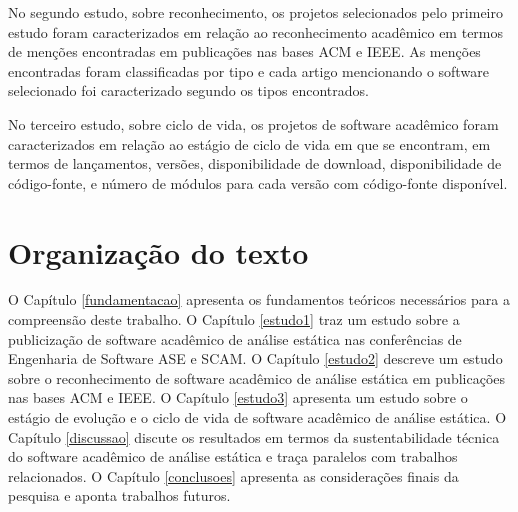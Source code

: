 No segundo estudo, sobre reconhecimento, os projetos selecionados pelo primeiro
estudo foram caracterizados em relação ao reconhecimento acadêmico em termos de
menções encontradas em publicações nas bases ACM e IEEE. As menções
encontradas foram classificadas por tipo e cada artigo mencionando o software
selecionado foi caracterizado segundo os tipos encontrados.

No terceiro estudo, sobre ciclo de vida, os projetos de software acadêmico
foram caracterizados em relação ao estágio de ciclo de vida em que se
encontram, em termos de lançamentos, versões, disponibilidade de download,
disponibilidade de código-fonte, e número de módulos para cada versão com
código-fonte disponível.

\section{Organização do texto}

O Capítulo \ref{fundamentacao} apresenta os fundamentos teóricos necessários
para a compreensão deste trabalho. O Capítulo \ref{estudo1} traz um estudo
sobre a publicização de software acadêmico de análise estática nas conferências
de Engenharia de Software ASE e SCAM. O Capítulo \ref{estudo2} descreve um
estudo sobre o reconhecimento de software acadêmico de análise estática em
publicações nas bases ACM e IEEE. O Capítulo \ref{estudo3} apresenta um estudo
sobre o estágio de evolução e o ciclo de vida de software acadêmico de análise
estática. O Capítulo \ref{discussao} discute os resultados em termos da
sustentabilidade técnica do software acadêmico de análise estática e traça
paralelos com trabalhos relacionados. O Capítulo \ref{conclusoes} apresenta as
considerações finais da pesquisa e aponta trabalhos futuros.
